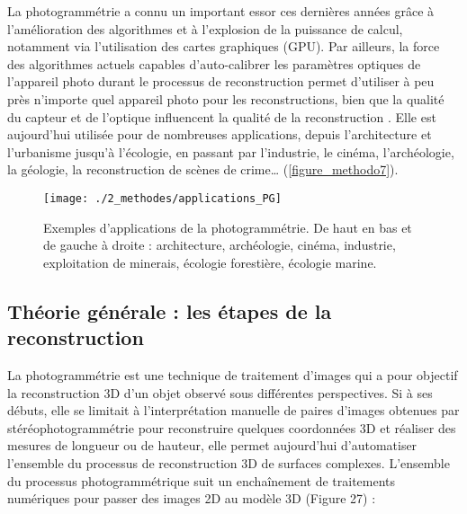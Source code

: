 La photogrammétrie a connu un important essor ces dernières années grâce à l’amélioration des algorithmes et à l’explosion de la puissance de calcul, notamment via l’utilisation des cartes graphiques (GPU). Par ailleurs, la force des algorithmes actuels capables d’auto-calibrer les paramètres optiques de l’appareil photo durant le processus de reconstruction \citep{forstner_photogrammetric_2016} permet d’utiliser à peu près n’importe quel appareil photo pour les reconstructions, bien que la qualité du capteur et de l’optique influencent la qualité de la reconstruction \citep{linder_digital_2016}. Elle est aujourd’hui utilisée pour de nombreuses applications, depuis l’architecture et l’urbanisme jusqu’à l’écologie, en passant par l’industrie, le cinéma, l’archéologie, la géologie, la reconstruction de scènes de crime… (\autoref{figure_methodo7}).

\begin{figure}[H]
	\begin{center}
	\texttt{[image: ./2\_methodes/applications\_PG]}
		\caption[Exemples d’applications de la photogrammétrie]{Exemples d’applications de la photogrammétrie. De haut en bas et de gauche à droite : architecture, archéologie, cinéma, industrie, exploitation de minerais, écologie forestière, écologie marine.}
	\label{figure_methodo7}
\end{center}
\end{figure}

\subsection{Théorie générale : les étapes de la reconstruction}

La photogrammétrie est une technique de traitement d’images qui a pour objectif la reconstruction 3D d’un objet observé sous différentes perspectives. Si à ses débuts, elle se limitait à l’interprétation manuelle de paires d’images obtenues par stéréophotogrammétrie pour reconstruire quelques coordonnées 3D et réaliser des mesures de longueur ou de hauteur, elle permet aujourd’hui d’automatiser l’ensemble du processus de reconstruction 3D de surfaces complexes. L’ensemble du processus photogrammétrique suit un enchaînement de traitements numériques pour passer des images 2D au modèle 3D (Figure 27) :

